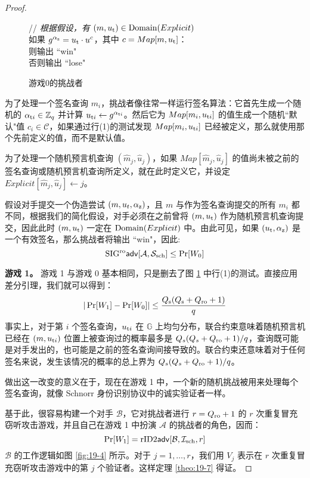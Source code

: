 \begin{proof}
\begin{figure}
  \hspace*{70pt} // \emph{根据假设，有 $(m,u_{\rm t})\in{\rm Domain}(Explicit)$}\\
  \hspace*{70pt} 如果 $g^{\alpha_{\rm z}}=u_{\rm t}\cdot u^c$，其中 $c=Map[m,u_{\rm t}]$：\\
  \hspace*{95pt} 则输出 ``win"\\
  \hspace*{95pt} 否则输出 ``lose"\\
  \caption{游戏0的挑战者}
  \label{fig:19-3}
\end{figure}

为了处理一个签名查询 $m_i$，挑战者像往常一样运行签名算法：它首先生成一个随机的 $\alpha_{{\rm t}i}\in\mathbb{Z}_q$ 并计算 $u_{{\rm t}i}\leftarrow g^{\alpha_{{\rm t}i}}$。然后它为 $Map[m_i,u_{{\rm t}i}]$ 的值生成一个随机``默认"值 $c_i\in\mathcal{C}$，如果通过行(1)的测试发现 $Map[m_i,u_{{\rm t}i}]$ 已经被定义，那么就使用那个先前定义的值，而不是默认值。

为了处理一个随机预言机查询 $(\widehat m_j,\widehat u_j)$，如果 $Map[\widehat m_j,\widehat u_j]$ 的值尚未被之前的签名查询或随机预言机查询所定义，就在此时定义它，并设定 $Explicit[\widehat m_j,\widehat u_j]\leftarrow j$。

假设对手提交一个伪造尝试 $(m,u_t,\alpha_{\rm z})$，且 $m$ 与作为签名查询提交的所有 $m_i$ 都不同，根据我们的简化假设，对手必须在之前曾将 $(m,u_{\rm t})$ 作为随机预言机查询提交，因此此时 $(m,u_{\rm t})$ 一定在 ${\rm Domain}(Explicit)$ 中。由此可见，如果 $(u_{\rm t},\alpha_{\rm z})$ 是一个有效签名，那么挑战者将输出 ``win"，因此:
$$
{\rm SIG^{ro}\mathsf{adv}}[\mathcal{A}, \mathcal{S}_{\rm sch}]\leq\Pr[W_0]
$$

\noindent
\textbf{游戏 1。}
游戏 1 与游戏 0 基本相同，只是删去了图 \ref{fig:19-3} 中行(1)的测试。直接应用差分引理，我们就可以得到：
$$
|\Pr[W_1]-\Pr[W_0]|\leq\frac{Q_{\rm s}(Q_{\rm s}+Q_{\rm ro}+1)}{q}
$$
事实上，对于第 $i$ 个签名查询，$u_{{\rm t}i}$ 在 $\mathbb{G}$ 上均匀分布，联合约束意味着随机预言机已经在 $(m,u_{{\rm t}i})$ 位置上被查询过的概率最多是 ${Q_s(Q_s+Q_{\rm ro}+1)}/{q}$，查询既可能是对手发出的，也可能是之前的签名查询间接导致的。联合约束还意味着对于任何签名来说，发生该情况的概率的总上界为 ${Q_s(Q_s+Q_{\rm ro}+1)}/{q}$。

做出这一改变的意义在于，现在在游戏 1 中，一个新的随机挑战被用来处理每个签名查询，就像 Schnorr 身份识别协议中的诚实验证者一样。

基于此，很容易构建一个对手 $\mathcal{B}$，它对挑战者进行 $r=Q_{\rm ro}+1$ 的 $r$ 次重复冒充窃听攻击游戏，并且自己在游戏 1 中扮演 $\mathcal{A}$ 的挑战者的角色，因而：
$$
\Pr[W_1] = {\rm rID2\mathsf{adv}}[\mathcal{B},\mathcal{I}_{\rm sch},r]
$$
$\mathcal{B}$ 的工作逻辑如图 \ref{fig:19-4} 所示。对于 $j=1,\dots,r$，我们用 $V_j$ 表示在 $r$ 次重复冒充窃听攻击游戏中的第 $j$ 个验证者。这样定理 \ref{theo:19-7} 得证。
\end{proof}

